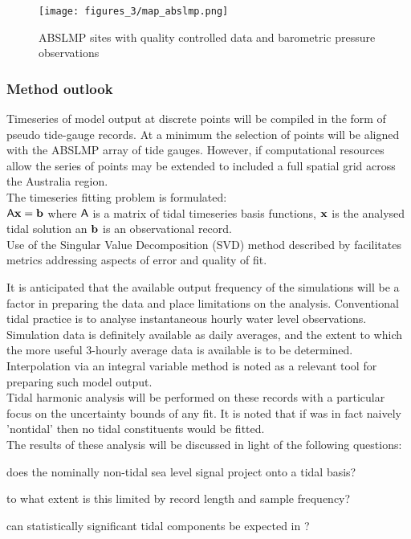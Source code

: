 \begin{figure}[h]
\begin{center}
\texttt{[image: figures\_3/map\_abslmp.png]}
\caption{ABSLMP sites with quality controlled data and barometric pressure observations}
\label{fig:ABSLMP}
\end{center}
\end{figure}



\subsubsection{Method outlook}
Timeseries of model output at discrete points will be compiled in the form of pseudo tide-gauge records.  At a minimum the selection of points will be aligned with the ABSLMP  array of tide gauges.  However, if computational resources allow the series of points may be extended to included a full spatial grid across the Australia region. \\

The timeseries fitting problem is formulated:\\
 $\mathsf{A} \mathbf{x}=\mathbf{b}$
 where $\mathsf{A}$ is a matrix of tidal timeseries basis functions, $\mathbf{x}$ is the analysed tidal solution an $\mathbf{b}$ is an observational record. \\
Use of the Singular Value Decomposition (SVD) method described by \citep{Cherniawsky:2011en} facilitates metrics addressing aspects of error and quality of fit.



It is anticipated that the available output frequency of the simulations will be a factor in preparing the data and place limitations on the analysis.   Conventional tidal practice is to analyse instantaneous hourly water level observations.   Simulation data is definitely available as daily averages, and the extent to which the more useful 3-hourly average data is available is to be determined.  Interpolation via an integral variable method is noted as a relevant tool for preparing such model output.\\
Tidal harmonic analysis will be performed on these records with a particular focus on the uncertainty bounds of any fit. It is noted that if \BL{} was in fact naively 'nontidal' then no tidal constituents would be fitted. \\



The results of these analysis will be discussed in light of the following questions: 
\begin{inparaenum}[(a)]
\item does the nominally non-tidal sea level signal project onto a tidal basis?
\item to what extent is this limited by record length and sample frequency?
\item can statistically significant tidal components be expected in \BL{}?
\end{inparaenum}



